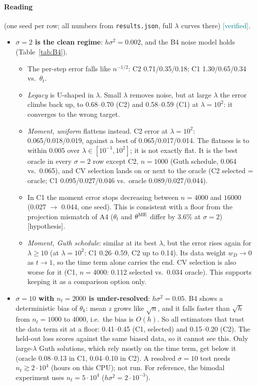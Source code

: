 \documentclass[11pt,a4paper]{article}
\newcommand{\code}[1]{\texttt{#1}}
\newcommand{\ver}{\textcolor{teal}{\textsf{[verified]}}}
\newcommand{\hyp}{\textcolor{orange!80!black}{\textsf{[hypothesis]}}}
\begin{document}
\paragraph{Reading} (one seed per row; all numbers from \code{results.json}, full $\lambda$ curves there) \ver.
\begin{itemize}
\item \textbf{$\sigma=2$ is the clean regime}: $h\sigma^2=0.002$, and the B4 noise model holds (Table~\ref{tab:B4}).
  \begin{itemize}
  \item The per-step error falls like $n^{-1/2}$: C2 0.71/0.35/0.18; C1 1.30/0.65/0.34 vs.\ $\theta_t$.
  \item \emph{Legacy} is U-shaped in $\lambda$. Small $\lambda$ removes noise, but at large $\lambda$ the error climbs back up, to 0.68--0.70 (C2) and 0.58--0.59 (C1) at $\lambda=10^2$: it converges to the wrong target.
  \item \emph{Moment, uniform} flattens instead. C2 error at $\lambda=10^2$: 0.065/0.018/0.019, against a best of 0.065/0.017/0.014. The flatness is to within 0.005 over $\lambda\in[10^{-1},10^2]$; it is not exactly flat. It is the best oracle in every $\sigma=2$ row except C2, $n=1000$ (Guth schedule, 0.064 vs.\ 0.065), and CV selection lands on or next to the oracle (C2 selected = oracle; C1 0.095/0.027/0.046 vs.\ oracle 0.089/0.027/0.044).
  \item In C1 the moment error stops decreasing between $n=4000$ and $16000$ (0.027 $\to$ 0.044, one seed). This is consistent with a floor from the projection mismatch of A4 ($\theta_t$ and $\theta^{\rm ME}$ differ by 3.6\% at $\sigma=2$) \hyp.
  \item \emph{Moment, Guth schedule}: similar at its best $\lambda$, but the error rises again for $\lambda\ge10$ (at $\lambda=10^2$: C1 0.26--0.59, C2 up to 0.14). Its data weight $w_D\to0$ as $t\to1$, so the time term alone carries the end. CV selection is also worse for it (C1, $n=4000$: 0.112 selected vs.\ 0.034 oracle). This supports keeping it as a comparison option only.
  \end{itemize}
\item \textbf{$\sigma=10$ with $n_t=2000$ is under-resolved}: $h\sigma^2=0.05$. B4 shows a deterministic bias of $\hat\theta_k$: mean $z$ grows like $\sqrt n$, and it falls faster than $\sqrt h$ from $n_t=1000$ to 4000, i.e.\ the bias is $O(h)$. So all estimators that trust the data term sit at a floor: 0.41--0.45 (C1, selected) and 0.15--0.20 (C2). The held-out loss scores against the same biased data, so it cannot see this. Only large-$\lambda$ Guth solutions, which rely mostly on the time term, get below it (oracle 0.08--0.13 in C1, 0.04--0.10 in C2). A resolved $\sigma=10$ test needs $n_t\gtrsim2\cdot10^4$ (hours on this CPU); not run. For reference, the bimodal experiment uses $n_t=5\cdot10^4$ ($h\sigma^2=2\cdot10^{-3}$).
\end{itemize}
\end{document}
